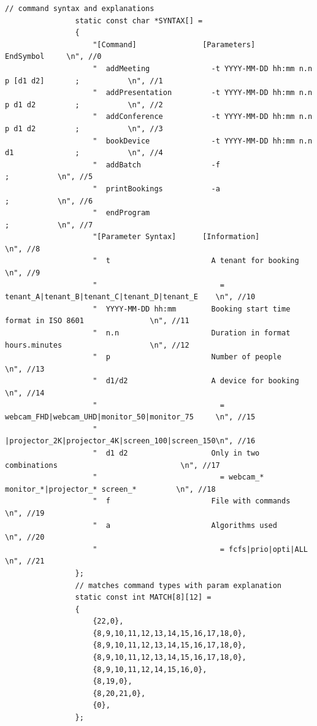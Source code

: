\documentclass{article}
\begin{document}
\begin{Verbatim}[gobble=8]
                // command syntax and explanations
                static const char *SYNTAX[] =
                {
                    "[Command]               [Parameters]                            EndSymbol     \n", //0
                    "  addMeeting              -t YYYY-MM-DD hh:mm n.n p [d1 d2]       ;           \n", //1
                    "  addPresentation         -t YYYY-MM-DD hh:mm n.n p d1 d2         ;           \n", //2
                    "  addConference           -t YYYY-MM-DD hh:mm n.n p d1 d2         ;           \n", //3
                    "  bookDevice              -t YYYY-MM-DD hh:mm n.n d1              ;           \n", //4
                    "  addBatch                -f                                      ;           \n", //5
                    "  printBookings           -a                                      ;           \n", //6
                    "  endProgram                                                      ;           \n", //7
                    "[Parameter Syntax]      [Information]                                         \n", //8
                    "  t                       A tenant for booking                                \n", //9
                    "                            = tenant_A|tenant_B|tenant_C|tenant_D|tenant_E    \n", //10
                    "  YYYY-MM-DD hh:mm        Booking start time format in ISO 8601               \n", //11
                    "  n.n                     Duration in format hours.minutes                    \n", //12
                    "  p                       Number of people                                    \n", //13
                    "  d1/d2                   A device for booking                                \n", //14
                    "                            = webcam_FHD|webcam_UHD|monitor_50|monitor_75     \n", //15
                    "                              |projector_2K|projector_4K|screen_100|screen_150\n", //16
                    "  d1 d2                   Only in two combinations                            \n", //17
                    "                            = webcam_* monitor_*|projector_* screen_*         \n", //18
                    "  f                       File with commands                                  \n", //19
                    "  a                       Algorithms used                                     \n", //20
                    "                            = fcfs|prio|opti|ALL                              \n", //21
                };
                // matches command types with param explanation
                static const int MATCH[8][12] =
                {
                    {22,0},
                    {8,9,10,11,12,13,14,15,16,17,18,0},
                    {8,9,10,11,12,13,14,15,16,17,18,0},
                    {8,9,10,11,12,13,14,15,16,17,18,0},
                    {8,9,10,11,12,14,15,16,0},
                    {8,19,0},
                    {8,20,21,0},
                    {0},
                };
                

\end{Verbatim}
\end{document}

